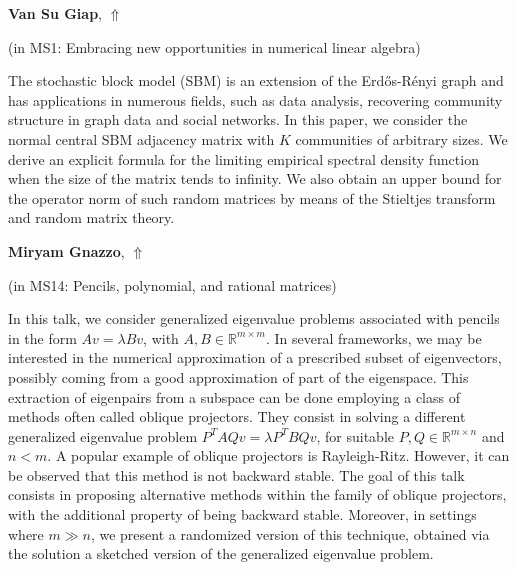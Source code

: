\documentclass[ILAS2025-program.tex]{subfiles}
\begin{document}
     \hypertarget{down0272}{}\begin{ilasabstract}
    
    \textbf{Van Su Giap},  \hfill \hyperlink{up0272}{$\Uparrow$}
    
    (in {\color{mstitle}MS1: Embracing new opportunities in numerical linear algebra})
        
        \mtskip
    The stochastic block model (SBM) is an extension of the Erd\H{o}s-R\'{e}nyi graph and has applications in numerous fields, such as data analysis, recovering community structure in graph data and social networks. In this paper, we consider the normal central SBM adjacency matrix with $K$ communities of arbitrary sizes. We derive an explicit formula for the limiting empirical spectral density function when the size of the matrix tends to infinity. We also obtain an upper bound for the operator norm of such random matrices by means of the Stieltjes transform and random matrix theory.
\end{ilasabstract}
     \hypertarget{down0372}{}\begin{ilasabstract}
    
    \textbf{Miryam Gnazzo},  \hfill \hyperlink{up0372}{$\Uparrow$}
    
    (in {\color{mstitle}MS14: Pencils, polynomial, and rational matrices})
        
        \mtskip
    In this talk, we consider generalized eigenvalue problems associated with pencils in the form $A v = \lambda B v$, with $A,B \in \mathbb{R}^{m \times m}$. In several frameworks, we may be interested in the numerical approximation of a prescribed subset of eigenvectors, possibly coming from a good approximation of part of the eigenspace. This extraction of eigenpairs from a subspace can be done employing a class of methods often called oblique projectors. They consist in solving a different generalized eigenvalue problem $P^TAQv = \lambda P^T B Qv$, for suitable $P,Q\in \mathbb{R}^{m \times n}$ and $n<m$. A popular example of oblique projectors is Rayleigh-Ritz. However, it can be observed that this method is not backward stable. The goal of this talk consists in proposing alternative methods within the family of oblique projectors, with the additional property of being backward stable. Moreover, in settings where $m \gg n$, we present a randomized version of this technique, obtained via the solution a sketched version of the generalized eigenvalue problem.
\end{ilasabstract}
\end{document}
